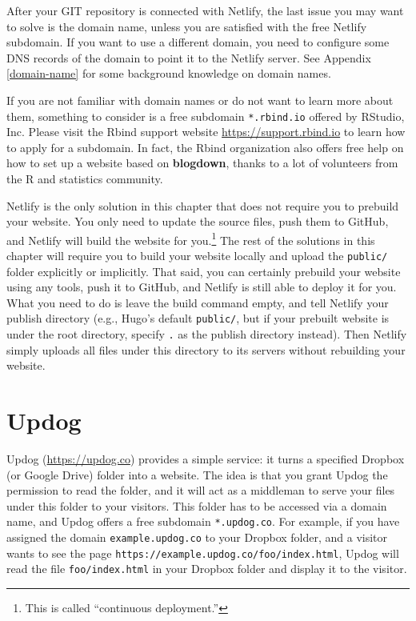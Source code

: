 \documentclass[12pt,]{krantz}
\theoremstyle{definition}
\theoremstyle{definition}
\theoremstyle{definition}
\theoremstyle{remark}
\begin{document}
After your GIT repository is connected with Netlify, the last issue you
may want to solve is the domain name, unless you are
satisfied with the free Netlify subdomain. If you want to use a
different domain, you need to configure some DNS records of the domain
to point it to the Netlify server. See Appendix \ref{domain-name} for
some background knowledge on domain names.

If you are not familiar with domain names or do not want to learn more
about them, something to consider is a free subdomain
\texttt{*.rbind.io} offered by RStudio, Inc. Please visit the Rbind
support website \url{https://support.rbind.io} to learn how to apply for
a subdomain. In fact, the Rbind organization also offers free help on
how to set up a website based on \textbf{blogdown}, thanks to a lot of
volunteers from the R and statistics community.

Netlify is the only solution in this chapter that does not require you
to prebuild your website. You only need to update the source files, push
them to GitHub, and Netlify will build the website for you.\footnote{This
  is called ``continuous deployment.''} The rest of the solutions in
this chapter will require you to build your website locally and upload
the \texttt{public/} folder explicitly or implicitly. That said, you can
certainly prebuild your website using any tools, push it to GitHub, and
Netlify is still able to deploy it for you. What you need to do is leave
the build command empty, and tell Netlify your publish directory (e.g.,
Hugo's default \texttt{public/}, but if your prebuilt website is under
the root directory, specify \texttt{.} as the publish directory
instead). Then Netlify simply uploads all files under this directory to
its servers without rebuilding your website.

\section{Updog}\label{updog}

Updog (\url{https://updog.co}) provides a simple service:
it turns a specified Dropbox (or Google Drive) folder into a website.
The idea is that you grant Updog the permission to read the folder, and
it will act as a middleman to serve your files under this folder to your
visitors. This folder has to be accessed via a domain name, and Updog
offers a free subdomain \texttt{*.updog.co}. For example, if you have
assigned the domain \texttt{example.updog.co} to your Dropbox folder,
and a visitor wants to see the page
\texttt{https://example.updog.co/foo/index.html}, Updog will read the
file \texttt{foo/index.html} in your Dropbox folder and display it to
the visitor.
\end{document}
